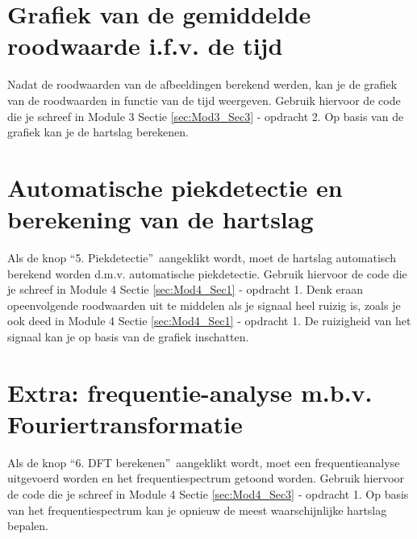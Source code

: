\section{Grafiek van de gemiddelde roodwaarde i.f.v. de tijd}
\label{sec:Mod5_Sec4}
%
Nadat de roodwaarden van de afbeeldingen berekend werden, kan je de grafiek van de roodwaarden in functie van de tijd weergeven. Gebruik hiervoor de code die je schreef in Module 3 Sectie \ref{sec:Mod3_Sec3} - opdracht 2. Op basis van de grafiek kan je de hartslag berekenen.

\section{Automatische piekdetectie en berekening van de hartslag}
\label{sec:Mod5_Sec5}
%
Als de knop \textquotedblleft 5. Piekdetectie\textquotedblright \ aangeklikt wordt, moet de hartslag automatisch berekend worden d.m.v. automatische piekdetectie. Gebruik hiervoor de code die je schreef in Module 4 Sectie \ref{sec:Mod4_Sec1} - opdracht 1. Denk eraan opeenvolgende roodwaarden uit te middelen als je signaal heel ruizig is, zoals je ook deed in Module 4 Sectie \ref{sec:Mod4_Sec1} - opdracht 1. De ruizigheid van het signaal kan je op basis van de grafiek inschatten.

\section{Extra: frequentie-analyse m.b.v. Fouriertransformatie}
\label{sec:Mod5_Sec6}
%  
Als de knop \textquotedblleft 6. DFT berekenen\textquotedblright \ aangeklikt wordt, moet een frequentieanalyse uitgevoerd worden en het frequentiespectrum getoond worden. Gebruik hiervoor de code die je schreef in Module 4 Sectie \ref{sec:Mod4_Sec3} - opdracht 1. Op basis van het frequentiespectrum kan je opnieuw de meest waarschijnlijke hartslag bepalen.

